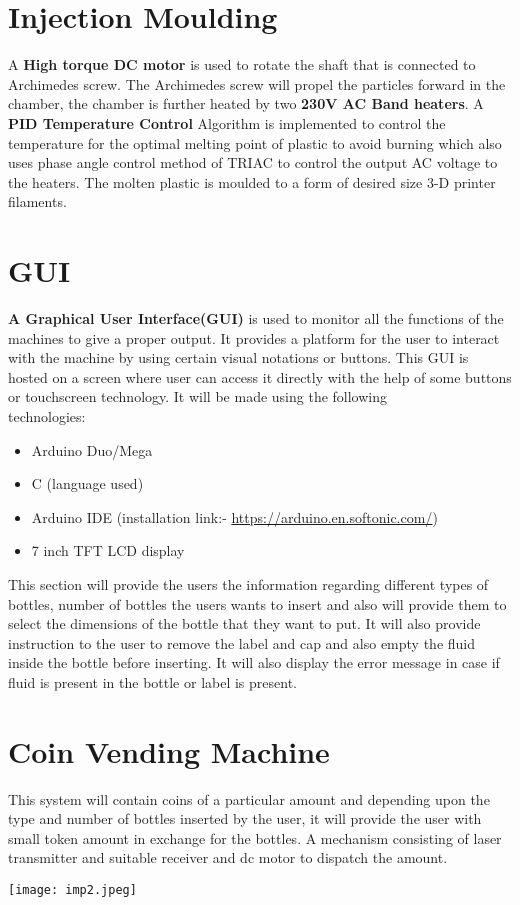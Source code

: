 \documentclass{article}
\begin{document}
\section{Injection Moulding}
\Large
A \textbf{High torque DC motor} is used to rotate the shaft that is connected to Archimedes screw. The Archimedes screw will propel the particles forward in the chamber, the chamber is further heated by two \textbf{230V AC Band heaters}. A \textbf{PID Temperature Control} Algorithm is implemented to control the temperature for the optimal melting point of plastic to avoid burning which also uses phase angle control method of TRIAC to control the output AC voltage to the heaters. The molten plastic is moulded to a form of desired size 3-D printer filaments.
\newline
\section{GUI}
\Large
\textbf{A Graphical User Interface(GUI)} is used to monitor all the functions of the machines to give a proper output. It provides a platform for the user to interact with the machine by using certain visual notations or buttons. This GUI is hosted on a screen where user can access it directly with the help of some buttons or touchscreen technology. It will be made using the following \\technologies:
\begin{itemize}
    	\item Arduino Duo/Mega
	 \item C (language used)
	 \item Arduino IDE (installation link:- \href{https://arduino.en.softonic.com/}{https://arduino.en.softonic.com/})
	\item 7 inch TFT LCD display
\end{itemize}
This section will provide the users the information regarding different types of bottles, number of bottles the users wants to insert and also will provide them to select the dimensions of the bottle that they want to put. It will also provide instruction to the user to remove the label and cap and also empty the fluid inside the  bottle before inserting. It will also display the error message in case if fluid is present in the bottle or label is present.      
 \newline
\section{Coin Vending Machine}
\Large
This system will contain coins of a particular amount and depending upon the type and number of bottles inserted by the user, it will provide the user with small token amount in exchange for the bottles. A mechanism consisting of laser transmitter and suitable receiver and dc motor to dispatch the amount.
\newline
\begin{center}
\texttt{[image: imp2.jpeg]}    
\end{center}
\newpage
\end{document}
